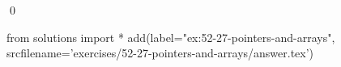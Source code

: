
\begin{ex}
  \label{ex:52-27-pointers-and-arrays}
  
  \qed
\end{ex}
\begin{python0}
from solutions import *
add(label="ex:52-27-pointers-and-arrays",
    srcfilename='exercises/52-27-pointers-and-arrays/answer.tex')
\end{python0}
